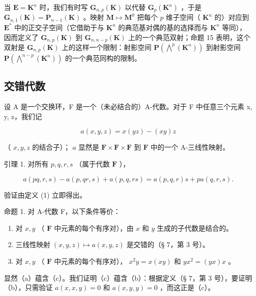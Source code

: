 当 \(\mathbf{E} = \mathbf{K}^n\) 时，我们有时写 \(\mathbf{G}_{n,p}(\mathbf{K})\) 以代替 \(\mathbf{G}_p(\mathbf{K}^n)\) ，于是 \(\mathbf{G}_{n,1}(\mathbf{K}) = \mathbf{P}_{n-1}(\mathbf{K})\) 。映射 \(\mathbf{M} \mapsto \mathbf{M}^0\) 把每个 \(p\) 维子空间（ \(\mathbf{K}^n\) 的）对应到 \(\mathbf{E}^*\) 中的正交子空间（它借助于与 \(\mathbf{K}^n\) 的典范基对偶的基的选择而与 \(\mathbf{K}^n\) 等同），因而定义了 \(\mathbf{G}_{n,p}(\mathbf{K})\) 到 \(\mathbf{G}_{n,n-p}(\mathbf{K})\) 上的一个典范双射；命题 15 表明，这个双射是 \(\mathbf{G}_{n,p}(\mathbf{K})\) 上的这样一个限制：射影空间 \(\mathbf{P}(\bigwedge^p (\mathbf{K}^n))\) 到射影空间 \(\mathbf{P}(\bigwedge^{n-p}(\mathbf{K}^n))\) 的一个典范同构的限制。


\subsection{交错代数}

设 A 是一个交换环，F 是一个（未必结合的）A-代数。对于 F 中任意三个元素 x, y, z，我们记

\[
a (x, y, z) = x (y z) - (x y) z\tag{1}
\]

（ \(x, y, z\) 的结合子）； \(a\) 显然是 \(\mathbf{F} \times \mathbf{F} \times \mathbf{F}\) 到 \(\mathbf{F}\) 中的一个 A-三线性映射。

引理 1. 对所有 \(p, q, r, s\) （属于代数 \(\mathbf{F}\) ），

\[
a (p q, r, s) - a (p, q r, s) + a (p, q, r s) = a (p, q, r) s + p a (q, r, s).\tag{2}
\]

验证由定义 (1) 立即得出。

命题 1. 对 A-代数 F，以下条件等价：

\begin{enumerate}
\def\labelenumi{(\alph{enumi})}
\item
  对 \(x, y\) （ \(\mathbf{F}\) 中元素的每个有序对），由 \(x\) 和 \(y\) 生成的子代数是结合的。
\item
  三线性映射 \((x, y, z) \mapsto a(x, y, z)\) 是交错的（§ 7，第 3 号）。
\item
  对 \(x, y\) （ \(\mathbf{F}\) 中元素的每个有序对）， \(x^2y = x(xy)\) 和 \(yx^2 = (yx)x\) 。
\end{enumerate}

显然（a）蕴含（c）。我们证明（c）蕴含（b）：根据定义（§ 7，第 3 号），要证明（b），只需验证 \(a(x, x, y) = 0\) 和 \(a(x, y, y) = 0\) ，而这正是（c）。

